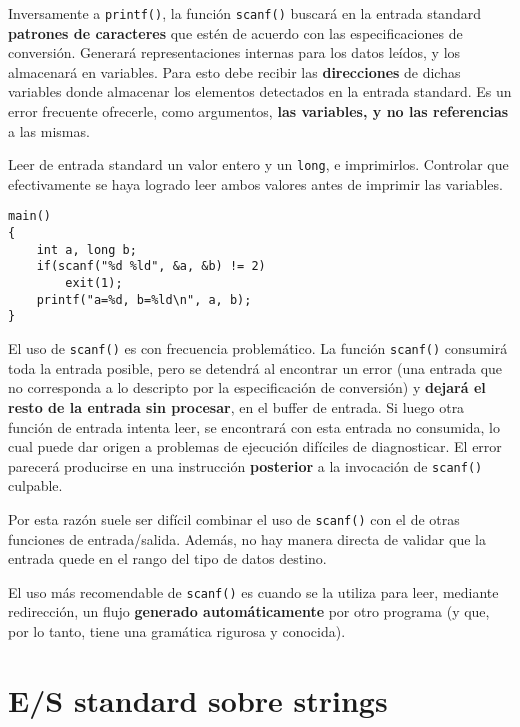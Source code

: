 Inversamente a \lstinline{printf()}, la función \lstinline{scanf()} buscará en la entrada standard
\textbf{patrones de caracteres} que estén de acuerdo con las especificaciones de conversión. Generará
representaciones internas para los datos leídos, y los almacenará en variables.
Para esto debe recibir las \textbf{direcciones} de dichas variables donde almacenar los
elementos detectados en la entrada standard. Es un error frecuente ofrecerle,
como argumentos, \textbf{las variables, y no las referencias} a las mismas.


\begin{ejemplo}
Leer de entrada standard un valor entero y un \lstinline{long}, e imprimirlos. Controlar que efectivamente se haya logrado leer ambos valores antes de imprimir las variables.
\begin{lstlisting}
main() 
{
    int a, long b;
    if(scanf("%d %ld", &a, &b) != 2)
        exit(1);
    printf("a=%d, b=%ld\n", a, b);
}
\end{lstlisting}
\end{ejemplo}


El uso de \lstinline{scanf()} es con frecuencia problemático. La función \lstinline{scanf()} consumirá
toda la entrada posible, pero se detendrá al encontrar un error (una entrada
que no corresponda a lo descripto por la especificación de conversión) y \textbf{dejará
el resto de la entrada sin procesar}, en el buffer de entrada. Si luego otra
función de entrada intenta leer, se encontrará con esta entrada no consumida,
lo cual puede dar origen a problemas de ejecución difíciles de diagnosticar. El
error parecerá producirse en una instrucción \textbf{posterior} a la invocación de \lstinline{scanf()} culpable. 

Por esta razón suele ser difícil combinar el uso de \lstinline{scanf()} con el de 
otras funciones de entrada/salida. Además, no hay manera directa de validar que
la entrada quede en el rango del tipo de datos destino.

El uso más recomendable de \lstinline{scanf()} es cuando se la utiliza para leer, mediante
redirección, un flujo \textbf{generado automáticamente} por otro programa (y que, por lo
tanto, tiene una gramática rigurosa y conocida).

\section{E/S standard sobre strings}
\label{subsec:esstandardstrings}

